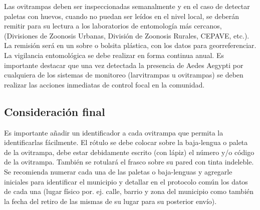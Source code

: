 Las ovitrampas deben ser inspeccionadas semanalmente y en el caso de detectar
paletas con huevos, cuando no puedan ser leídos en el nivel local, se deberán
remitir para su lectura a los laboratorios de entomología más cercanos,
(Divisiones de Zoonosis Urbanas, División de Zoonosis Rurales, CEPAVE, etc.).
La remisión será en un sobre o bolsita plástica, con los datos para georreferenciar.
La vigilancia entomológica se debe realizar en forma continua anual. Es
importante destacar que una vez detectada la presencia de Aedes Aegypti por
cualquiera de los sistemas de monitoreo (larvitrampas u ovitrampas) se deben
realizar las acciones inmediatas de control focal en la comunidad.

\subsection{Consideración final}
Es importante añadir un identificador a cada ovitrampa que permita la
identificarlas fácilmente. El rótulo se debe colocar sobre la baja-lengua
o paleta de la ovitrampa, debe estar debidamente escrito (con lápiz) el
número y/o código de la ovitrampa. También se rotulará el frasco sobre
su pared con tinta indeleble. Se recomienda numerar cada una de las paletas
o baja-lenguas y agregarle iniciales para identificar el municipio y
detallar en el protocolo común los datos de cada una (lugar físico por.
ej. calle, barrio y zona del municipio como también la fecha del retiro
de las mismas de su lugar para su posterior envío).
